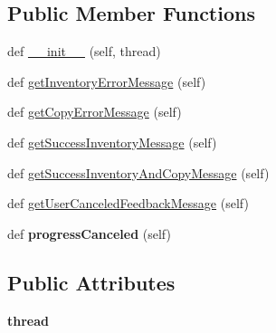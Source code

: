 \subsection*{Public Member Functions}
\begin{DoxyCompactItemize}
\item 
def \mbox{\hyperlink{class_dsg_tools_1_1_factories_1_1_thread_factory_1_1inventory_thread_1_1_inventory_messages_afdebc0069e5219a9e70f7af9399e7298}{\+\_\+\+\_\+init\+\_\+\+\_\+}} (self, thread)
\item 
def \mbox{\hyperlink{class_dsg_tools_1_1_factories_1_1_thread_factory_1_1inventory_thread_1_1_inventory_messages_acaa56999d5c8614492da09a23710841d}{get\+Inventory\+Error\+Message}} (self)
\item 
def \mbox{\hyperlink{class_dsg_tools_1_1_factories_1_1_thread_factory_1_1inventory_thread_1_1_inventory_messages_af500d330a3c297db02124e1044a53854}{get\+Copy\+Error\+Message}} (self)
\item 
def \mbox{\hyperlink{class_dsg_tools_1_1_factories_1_1_thread_factory_1_1inventory_thread_1_1_inventory_messages_a76d7fc2f7f4d7b428021f7adb13c559d}{get\+Success\+Inventory\+Message}} (self)
\item 
def \mbox{\hyperlink{class_dsg_tools_1_1_factories_1_1_thread_factory_1_1inventory_thread_1_1_inventory_messages_a9866574e9226b67a997e0edf354e9705}{get\+Success\+Inventory\+And\+Copy\+Message}} (self)
\item 
def \mbox{\hyperlink{class_dsg_tools_1_1_factories_1_1_thread_factory_1_1inventory_thread_1_1_inventory_messages_af94e6280493762f3ba7ba9c55201d5ee}{get\+User\+Canceled\+Feedback\+Message}} (self)
\item 
\mbox{\label{class_dsg_tools_1_1_factories_1_1_thread_factory_1_1inventory_thread_1_1_inventory_messages_a41ed3874d549b733051a5a48d25362f2}} 
def {\bfseries progress\+Canceled} (self)
\end{DoxyCompactItemize}
\subsection*{Public Attributes}
\begin{DoxyCompactItemize}
\item 
\mbox{\label{class_dsg_tools_1_1_factories_1_1_thread_factory_1_1inventory_thread_1_1_inventory_messages_a43ad99f506b5d09b6f50e02afa51fd68}} 
{\bfseries thread}
\end{DoxyCompactItemize}


